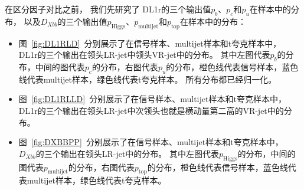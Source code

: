 在区分因子对比之前，
我们先研究了
DL1r的三个输出值$p_b$、$p_c$和$p_u$在样本中的分布，
以及$D_{Xbb}$的三个输出值$p_{\text{Higgs}}$、$p_{\text{multijet}}$和$p_{\text{top}}$在样本中的分布：
\begin{itemize}
\item 图~\ref{fig:DL1RLD}~分别展示了在信号样本、multijet样本和t夸克样本中，
DL1r的三个输出在领头LR-jet中领头VR-jet中的分布。
其中左图代表$p_b$的分布，中间的图代表$p_c$的分布，右图代表$p_u$的分布，橙色线代表信号样本，蓝色线代表multijet样本，绿色线代表t夸克样本。
所有分布都已经归一化。
\item 图~\ref{fig:DL1RLLD}~分别展示了在信号样本、multijet样本和t夸克样本中，
DL1r的三个输出在领头LR-jet中次领头也就是横动量第二高的VR-jet中的分布。



\item 图~\ref{fig:DXBBPP}~分别展示了在信号样本、multijet样本和t夸克样本中，
$D_{Xbb}$的三个输出在领头LR-jet中的分布。
其中左图代表$p_{\text{Higgs}}$的分布，中间的图代表$p_{\text{multijet}}$的分布，右图代表$p_{\text{top}}$的分布，橙色线代表信号样本，蓝色线代表multijet样本，绿色线代表t夸克样本。
\end{itemize}


